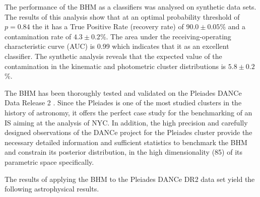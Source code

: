 The performance of the BHM as a classifiers was analysed on synthetic data sets. The results of this analysis show that at an optimal probability threshold of $p=0.84$ the it has a True Positive Rate (recovery rate) of $90.0\pm0.05$\% and a contamination rate of $4.3\pm0.2$\%. The area under the receiving-operating characteristic curve (AUC) is 0.99 which indicates that it as an excellent classifier. The synthetic analysis reveals that the expected value of the contamination in the kinematic and photometric cluster distributions is $5.8\pm 0.2$\%.

The BHM has been thoroughly tested and validated on the Pleiades DANCe Data Release 2 \cite{Bouy2015}. Since the Pleiades is one of the most studied clusters in the history of astronomy, it offers the perfect case study for the benchmarking of an IS aiming at the analysis of NYC. In addition, the high precision and carefully designed observations of the DANCe project for the Pleiades cluster provide the necessary detailed information and sufficient statistics to benchmark the BHM and constrain its posterior distribution, in the high dimensionality (85) of its parametric space specifically. 

The results of applying the BHM to the Pleiades DANCe DR2 data set yield the following astrophysical results.

